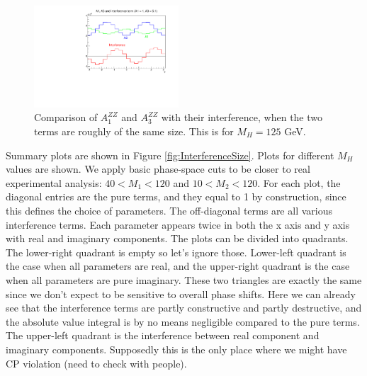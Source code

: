 \documentclass{cmspaper}
\begin{document}
\begin{figure}[htb!]
  \begin{center}
    \includegraphics[width=0.48\textwidth]{figures/SignalPhiComparison.pdf}
    \caption{Comparison of $A_1^{ZZ}$ and $A_3^{ZZ}$ with their interference, when the two terms are
    roughly of the same size.  This is for $M_H = 125$ GeV.}
    \label{fig:A1A3PhiDistribution}
  \end{center}
\end{figure}

Summary plots are shown in Figure \ref{fig:InterferenceSize}.  Plots for different $M_H$ values are shown.
We apply basic phase-space cuts to be closer to real experimental analysis: $40 < M_1 < 120$ and $10 < M_2 < 120$.
For each plot, the diagonal entries are the pure terms, and they equal to 1 by construction, since this defines
the choice of parameters.  The off-diagonal terms are all various interference terms.  Each parameter appears
twice in both the x axis and y axis with real and imaginary components.  The plots can be divided into
quadrants.  The lower-right quadrant is empty so let's ignore those.  Lower-left quadrant is the case
when all parameters are real, and the upper-right quadrant is the case when all parameters are pure imaginary.
These two triangles are exactly the same since we don't expect to be sensitive to overall phase shifts.
Here we can already see that the interference terms are partly constructive and partly destructive, and
the absolute value integral is by no means negligible compared to the pure terms.
The upper-left quadrant is the interference between real component and imaginary components.
Supposedly this is the only place where we might have CP violation (need to check with people).
\end{document}
